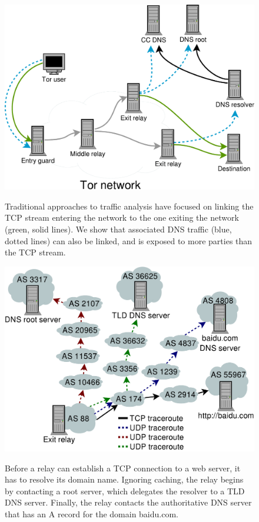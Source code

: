 \begin{figure}[t]
	\centering
	\includegraphics[width=\linewidth]{figures/overview.pdf}
	\label{fig:overview}
	\caption{Traditional approaches to traffic analysis have focused on linking
	the TCP stream entering the network to the one exiting the network (green,
	solid lines).  We show that associated DNS traffic (blue, dotted lines) can
	also be linked, and is exposed to more parties than the TCP stream.}
\end{figure}

\begin{figure}[t]
	\centering
	\includegraphics[width=\linewidth]{figures/as-exposure.pdf}
	\label{fig:as-exposure}
	\caption{Before a relay can establish a TCP connection to a web server, it
		has to resolve its domain name.  Ignoring caching, the relay begins by
		contacting a root server, which delegates the resolver to a TLD DNS
		server.  Finally, the relay contacts the authoritative DNS server that
		has an A record for the domain baidu.com.}
\end{figure}
